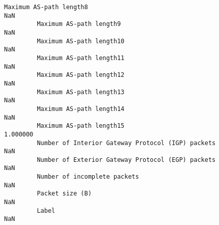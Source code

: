 \documentclass[11pt]{article}
\begin{document}
\begin{Verbatim}[commandchars=\\\{\}]
         Maximum AS-path length8                                                 NaN   
         Maximum AS-path length9                                                 NaN   
         Maximum AS-path length10                                                NaN   
         Maximum AS-path length11                                                NaN   
         Maximum AS-path length12                                                NaN   
         Maximum AS-path length13                                                NaN   
         Maximum AS-path length14                                                NaN   
         Maximum AS-path length15                                           1.000000   
         Number of Interior Gateway Protocol (IGP) packets                       NaN   
         Number of Exterior Gateway Protocol (EGP) packets                       NaN   
         Number of incomplete packets                                            NaN   
         Packet size (B)                                                         NaN   
         Label                                                                   NaN   
         

\end{Verbatim}
\end{document}

